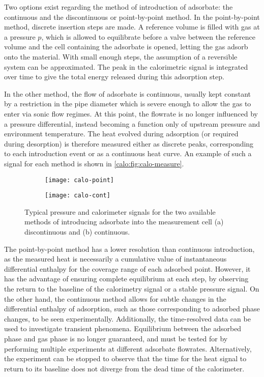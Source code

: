 Two options exist regarding the method of introduction of adsorbate:
the continuous and the discontinuous or point-by-point method. In
the point-by-point method, discrete insertion steps are made.
A reference volume is filled with gas at a pressure \(p\), which
is allowed to equilibrate before a valve between the reference volume
and the cell containing the adsorbate is opened, letting the
gas adsorb onto the material. With small enough steps, the
assumption of a reversible system can be approximated.
The peak in the calorimetric signal is integrated over time
to give the total energy released during this adsorption step.

In the other method, the flow of adsorbate is continuous, usually kept
constant by a restriction in the pipe diameter which is severe enough
to allow the gas to enter via sonic flow regimes. At this point, the
flowrate is no longer influenced by a pressure differential,
instead becoming a function only of upstream pressure and environment
temperature.
The heat evolved during adsorption (or required during desorption)
is therefore measured either as discrete peaks, corresponding to
each introduction event or as a continuous heat curve. An example of 
such a signal for each method is shown in \autoref{calo:fig:calo-measure}.

\begin{figure}[htb]

	\centering
	\begin{subfigure}[b]{.5\textwidth}
		\centering
		\texttt{[image: calo-point]}
		\caption{}%
		\label{calo:fig:calo-point}
	\end{subfigure}
	\begin{subfigure}[b]{.48\textwidth}
		\centering
		\texttt{[image: calo-cont]}
		\caption{}%
		\label{calo:fig:calo-cont}
	\end{subfigure}%
	\caption{Typical pressure and calorimeter signals for the two
		available methods of introducing adsorbate into the measurement
		cell (a) discontinuous and (b) continuous.
	}%
	\label{calo:fig:calo-measure}

\end{figure}

The point-by-point method has a lower resolution than
continuous introduction, as the measured heat is necessarily a 
cumulative value of instantaneous
differential enthalpy for the coverage range of each adsorbed point.
However, it has the advantage of ensuring complete equilibrium at
each step, by observing the return to the baseline of the calorimetry
signal or a stable pressure signal. On the other hand, the
continuous method allows for subtle changes in the differential enthalpy of
adsorption, such as those corresponding to adsorbed phase changes,
to be seen experimentally. Additionally, the time-resolved data
can be used to investigate transient phenomena. Equilibrium between
the adsorbed phase and gas phase is no longer guaranteed, and must be
tested for by performing multiple experiments at different adsorbate
flowrates. Alternatively, the experiment can be stopped to observe that the
time for the heat signal to return to its baseline does not diverge
from the dead time of the calorimeter.


